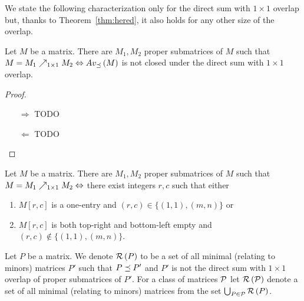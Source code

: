 We state the following characterization only for the direct sum with $1\times1$ overlap but, thanks to Theorem~\ref{thm:hered}, it also holds for any other size of the overlap.

\begin{thm}
Let $M$ be a matrix. There are $M_1,M_2$ proper submatrices of $M$ such that $M=M_1\nearrow_{1\times1}M_2\Leftrightarrow Av_{\preceq}\left(M\right)$ is not closed under the direct sum with $1\times1$ overlap.
\end{thm}
\begin{proof}
\begin{itemize}
	\item[$\Rightarrow$] TODO
	\item[$\Leftarrow$] TODO
\end{itemize}
\end{proof}

\begin{obs}
\label{obs:art}
Let $M$ be a matrix. There are $M_1,M_2$ proper submatrices of $M$ such that $M=M_1\nearrow_{1\times1}M_2\Leftrightarrow$ there exist integers $r,c$ such that either
\begin{enumerate}
	\item $M[r,c]$ is a one-entry and $(r,c)\in\{(1,1),(m,n)\}$ or
	\item $M[r,c]$ is both top-right and bottom-left empty and $(r,c)\not\in\{(1,1),(m,n)\}$.
\end{enumerate}
\end{obs}

\begin{defn}
Let $P$ be a matrix. We denote $\mathcal{R}\left(P\right)$ to be a set of all minimal (relating to minors) matrices $P'$ such that $P\preceq P'$ and $P'$ is not the direct sum with $1\times1$ overlap of proper submatrices of $P'$. For a class of matrices $\mathcal{P}$ let $\mathcal{R}\left(\mathcal{P}\right)$ denote a set of all minimal (relating to minors) matrices from the set $\bigcup_{P\in\mathcal{P}}\mathcal{R}\left(P\right)$.
\end{defn}

